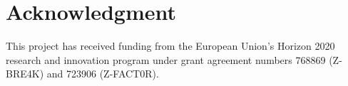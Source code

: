 \documentclass[conference]{IEEEtran}
\begin{document}
\section*{Acknowledgment}
\label{sec:Acknowledgment}
This project has received funding from the European Union's Horizon 2020 research and innovation program under grant agreement numbers 768869 (Z-BRE4K) and 723906 (Z-FACT0R).




\end{document}
